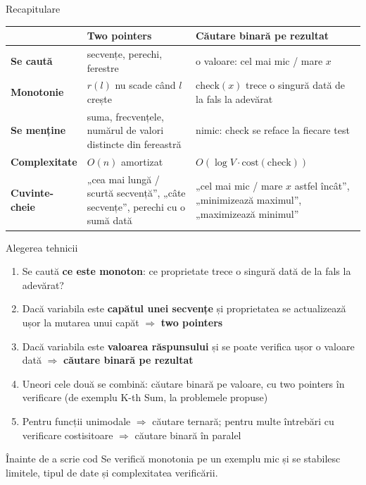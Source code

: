 \documentclass[8pt,mathserif]{beamer}
\begin{document}
\begin{frame}{Recapitulare}
  \renewcommand{\arraystretch}{1.35}
  \begin{tabular}{@{}p{}p{}p{}@{}}
    \toprule
     & \textbf{Two pointers} & \textbf{Căutare binară pe rezultat} \\
    \midrule
    \textbf{Se caută} & secvențe, perechi, ferestre & o valoare: cel mai mic / mare $x$ \\
    \textbf{Monotonie} & $r(l)$ nu scade când $l$ crește & $\mathrm{check}(x)$ trece o singură dată de la fals la adevărat \\
    \textbf{Se menține} & suma, frecvențele, numărul de valori distincte din fereastră & nimic: $\mathrm{check}$ se reface la fiecare test \\
    \textbf{Complexitate} & $O(n)$ amortizat & $O(\log V \cdot \mathrm{cost}(\mathrm{check}))$ \\
    \textbf{Cuvinte-cheie} & „cea mai lungă / scurtă secvență”, „câte secvențe”, perechi cu o sumă dată & „cel mai mic / mare $x$ astfel încât”, „minimizează maximul”, „maximizează minimul” \\
    \bottomrule
  \end{tabular}
\end{frame}

\begin{frame}{Alegerea tehnicii}
  \begin{enumerate}
    \item Se caută \textbf{ce este monoton}: ce proprietate trece o singură dată de la fals la adevărat?
    \item Dacă variabila este \textbf{capătul unei secvențe} și proprietatea se actualizează ușor la mutarea unui capăt $\Rightarrow$ \textbf{two pointers}
    \item Dacă variabila este \textbf{valoarea răspunsului} și se poate verifica ușor o valoare dată $\Rightarrow$ \textbf{căutare binară pe rezultat}
    \item Uneori cele două se combină: căutare binară pe valoare, cu two pointers în verificare (de exemplu K-th Sum, la problemele propuse)
    \item Pentru funcții unimodale $\Rightarrow$ căutare ternară; pentru multe întrebări cu verificare costisitoare $\Rightarrow$ căutare binară în paralel
  \end{enumerate}
  \begin{alertblock}{Înainte de a scrie cod}
    Se verifică monotonia pe un exemplu mic și se stabilesc limitele, tipul de date și complexitatea verificării.
  \end{alertblock}
\end{frame}
\end{document}
